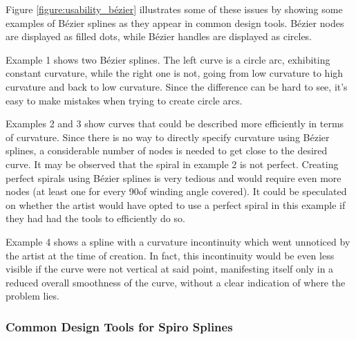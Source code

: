 \documentclass[a4paper]{article}
\begin{document}
				Figure \ref{figure:usability_bézier} illustrates some of these issues by showing some examples of Bézier splines as they appear in common design tools. Bézier nodes are displayed as filled dots, while Bézier handles are displayed as circles.

				Example 1 shows two Bézier splines. The left curve is a circle arc, exhibiting constant curvature, while the right one is not, going from low curvature to high curvature and back to low curvature. Since the difference can be hard to see, it's easy to make mistakes when trying to create circle arcs.

				Examples 2 and 3 show curves that could be described more efficiently in terms of curvature. Since there is no way to directly specify curvature using Bézier splines, a considerable number of nodes is needed to get close to the desired curve. It may be observed that the spiral in example 2 is not perfect. Creating perfect spirals using Bézier splines is very tedious and would require even more nodes (at least one for every 90\textdegree of winding angle covered). It could be speculated on whether the artist would have opted to use a perfect spiral in this example if they had had the tools to efficiently do so.

				Example 4 shows a spline with a curvature incontinuity which went unnoticed by the artist at the time of creation. In fact, this incontinuity would be even less visible if the curve were not vertical at said point, manifesting itself only in a reduced overall smoothness of the curve, without a clear indication of where the problem lies.

			\subsubsection{Common Design Tools for Spiro Splines}

\end{document}
